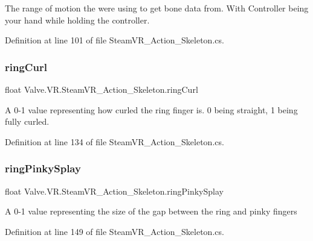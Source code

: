 The range of motion the we\textquotesingle{}re using to get bone data from. With Controller being your hand while holding the controller. 



Definition at line 101 of file Steam\+V\+R\+\_\+\+Action\+\_\+\+Skeleton.\+cs.

\mbox{\label{class_valve_1_1_v_r_1_1_steam_v_r___action___skeleton_aeffa6c5482f34a0a4975d79eb806e218}} 
\subsubsection{\texorpdfstring{ringCurl}{ringCurl}}
{\footnotesize\ttfamily float Valve.\+V\+R.\+Steam\+V\+R\+\_\+\+Action\+\_\+\+Skeleton.\+ring\+Curl\hspace{0.3cm}{\ttfamily [get]}}



A 0-\/1 value representing how curled the ring finger is. 0 being straight, 1 being fully curled. 



Definition at line 134 of file Steam\+V\+R\+\_\+\+Action\+\_\+\+Skeleton.\+cs.

\mbox{\label{class_valve_1_1_v_r_1_1_steam_v_r___action___skeleton_a467d52a2f9712d65918f79950f68d3be}} 
\subsubsection{\texorpdfstring{ringPinkySplay}{ringPinkySplay}}
{\footnotesize\ttfamily float Valve.\+V\+R.\+Steam\+V\+R\+\_\+\+Action\+\_\+\+Skeleton.\+ring\+Pinky\+Splay\hspace{0.3cm}{\ttfamily [get]}}



A 0-\/1 value representing the size of the gap between the ring and pinky fingers 



Definition at line 149 of file Steam\+V\+R\+\_\+\+Action\+\_\+\+Skeleton.\+cs.

